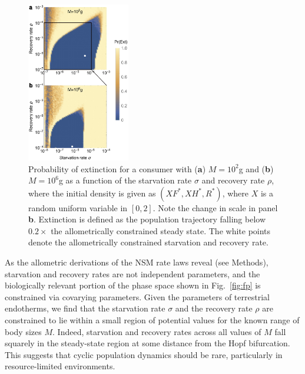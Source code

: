 \documentclass[twocolumn,preprintnumbers,amsmath,amssymb,superscriptaddress]{revtex4}
\begin{document}
\begin{figure}
\centering
\includegraphics[width=0.4\textwidth]{fig_ExtinctionAllometricComb4.eps}
\caption{\small{ Probability of extinction for a consumer with ({\bf a}) $M=10^2$g and ({\bf b}) $M=10^6$g as a function of the starvation rate $\sigma$ and recovery rate $\rho$, where the initial density is given as $(XF^*,XH^*,R^*)$, where $X$ is a random uniform variable in $[0,2]$. Note the change in scale in panel {\bf b}.  Extinction is defined as the population trajectory falling below $0.2\times$ the allometrically constrained steady state. The white points denote the allometrically constrained starvation and recovery rate.}\label{fig:ext}}
\end{figure}

As the allometric derivations of the NSM rate laws reveal (see Methods),
starvation and recovery rates are not independent parameters, and the
biologically relevant portion of the phase space shown in Fig.~\ref{fig:fp}
is constrained via covarying parameters.  Given the parameters of terrestrial
endotherms, we find that the starvation rate $\sigma$ and the recovery rate
$\rho$ are constrained to lie within a small region of potential values for
the known range of body sizes $M$.  Indeed, starvation and recovery rates
across all values of $M$ fall squarely in the steady-state region at some
distance from the Hopf bifurcation.  This suggests that cyclic population
dynamics should be rare, particularly in resource-limited environments.
\end{document}
